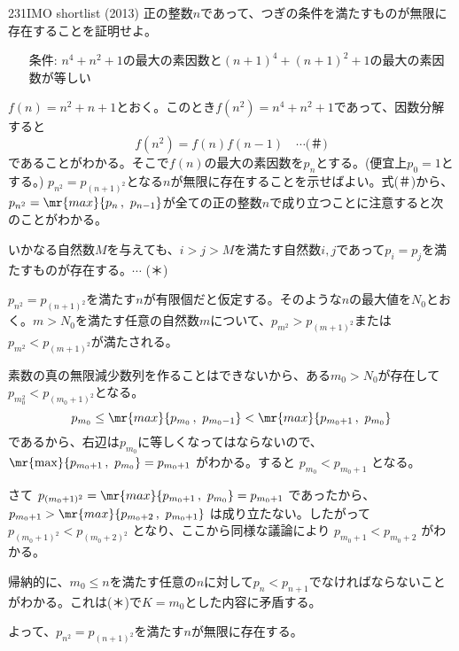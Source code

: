 \begin{thm}{231}{}{IMO shortlist (2013)}
 正の整数$n$であって、つぎの条件を満たすものが無限に存在することを証明せよ。
 \begin{itemize}
  \item[条件:] $n^4+n^2+1$の最大の素因数と$(n+1)^4+(n+1)^2+1$の最大の素因数が等しい 
 \end{itemize}
\end{thm}

$f(n)=n^2+n+1$とおく。このとき$f(n^2)=n^4+n^2+1$であって、因数分解すると
\[ f(n^2)=f(n)f(n-1) \quad\cdots\text{(＃)} \]
であることがわかる。そこで$f(n)$の最大の素因数を$p_n$とする。(便宜上$p_0=1$とする。) $p_{n^2}=p_{(n+1)^2}$となる$n$が無限に存在することを示せばよい。式(＃)から、$p_{n^2}=\mr{max}\{p_n\,,\,\,p_{n-1}\}$が全ての正の整数$n$で成り立つことに注意すると次のことがわかる。

いかなる自然数$M$を与えても、$i>j>M$を満たす自然数$i, j$であって$p_i=p_j$を満たすものが存在する。$\cdots$ (＊)

$p_{n^2}=p_{(n+1)^2}$を満たす$n$が有限個だと仮定する。そのような$n$の最大値を$N_0$とおく。$m>N_0$を満たす任意の自然数$m$について、$p_{m^2}>p_{(m+1)^2}$または$p_{m^2}<p_{(m+1)^2}$が満たされる。

素数の真の無限減少数列を作ることはできないから、ある$m_0>N_0$が存在して$p_{m_0^2}<p_{(m_0+1)^2}$となる。
\[ p_{m_0}\le \mr{max}\{p_{m_0}\,,\,\,p_{m_0-1}\} < \mr{max}\{p_{m_0+1}\,,\,\,p_{m_0}\} \]
であるから、右辺は$p_{m_0}$に等しくなってはならないので、 $\mr{\max}\{p_{m_0+1}\,,\,\,p_{m_0}\}=p_{m_0+1}$ がわかる。すると $p_{m_0}<p_{m_0+1}$ となる。

さて $p_{(m_0+1)^2}=\mr{max}\{p_{m_0+1}\,,\,\,p_{m_0}\}=p_{m_0+1}$ であったから、 $p_{m_0+1}>\mr{max}\{p_{m_0+2}\,,\,\,p_{m_0+1}\}$ は成り立たない。したがって $p_{(m_0+1)^2}<p_{(m_0+2)^2}$ となり、ここから同様な議論により $p_{m_0+1}<p_{m_0+2}$ がわかる。

帰納的に、$m_0\le n$を満たす任意の$n$に対して$p_n<p_{n+1}$でなければならないことがわかる。これは(＊)で$K=m_0$とした内容に矛盾する。

よって、$p_{n^2}=p_{(n+1)^2}$を満たす$n$が無限に存在する。